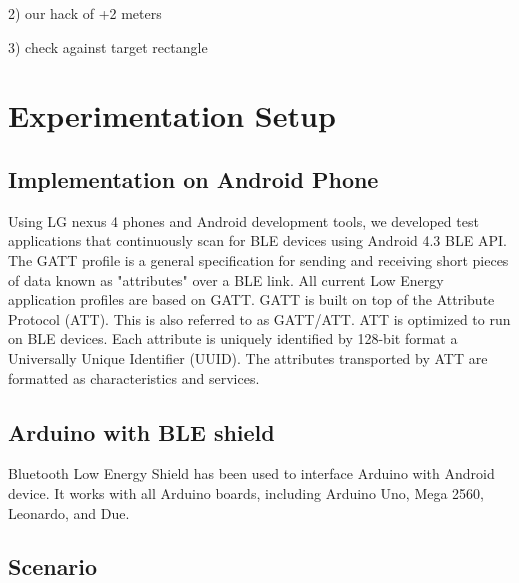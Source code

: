 \documentclass[conference,a4paper]{../../sty/IEEEtran}
\begin{document}
2) our hack of +2 meters

3) check against target rectangle


\section{Experimentation Setup}

\subsection{Implementation on Android Phone}

Using LG nexus 4 phones and Android development tools, we developed test applications that continuously scan for BLE devices using Android 4.3 BLE API. The GATT profile is a general specification for sending and receiving short pieces of data known as "attributes" over a BLE link. All current Low Energy application profiles are based on GATT. GATT is built on top of the Attribute Protocol (ATT). This is also referred to as GATT/ATT. ATT is optimized to run on BLE devices. Each attribute is uniquely identified by 128-bit format a Universally Unique Identifier (UUID). The attributes transported by ATT are formatted as characteristics and services.

\subsection{Arduino with BLE shield}

Bluetooth Low Energy Shield has been used to interface Arduino with Android device. It works with all Arduino boards, including Arduino Uno, Mega 2560, Leonardo, and Due. 

\subsection{Scenario}
\end{document}
